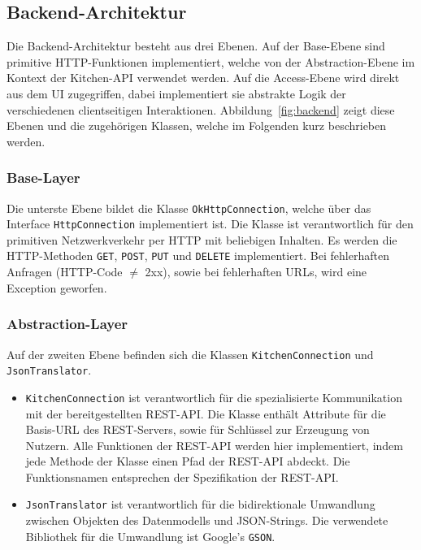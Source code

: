 \subsection{Backend-Architektur}\label{subsec:backend}

Die Backend-Architektur besteht aus drei Ebenen.
Auf der Base-Ebene sind primitive HTTP-Funktionen implementiert,
welche von der Abstraction-Ebene im Kontext der Kitchen-API verwendet werden.
Auf die Access-Ebene wird direkt aus dem UI zugegriffen, dabei implementiert sie abstrakte Logik der verschiedenen clientseitigen Interaktionen.
Abbildung~\ref{fig:backend} zeigt diese Ebenen und die zugehörigen Klassen, welche im Folgenden kurz beschrieben werden.


\subsubsection{Base-Layer}

Die unterste Ebene bildet die Klasse \texttt{OkHttpConnection}, welche über das Interface \texttt{HttpConnection} implementiert ist.
Die Klasse ist verantwortlich für den primitiven Netzwerkverkehr per HTTP mit beliebigen Inhalten.
Es werden die HTTP-Methoden \texttt{GET}, \texttt{POST}, \texttt{PUT} und \texttt{DELETE} implementiert.
Bei fehlerhaften Anfragen (HTTP-Code $\neq$ 2xx), sowie bei fehlerhaften URLs, wird eine Exception geworfen.

\subsubsection{Abstraction-Layer}

Auf der zweiten Ebene befinden sich die Klassen \texttt{KitchenConnection} und \texttt{JsonTranslator}.

\begin{itemize}
	\item  \texttt{KitchenConnection} ist verantwortlich für die spezialisierte Kommunikation mit der bereitgestellten REST-API. Die Klasse enthält Attribute für die Basis-URL des REST-Servers, sowie für Schlüssel zur Erzeugung von Nutzern.
	Alle Funktionen der REST-API werden hier implementiert, indem jede Methode der Klasse einen Pfad der REST-API abdeckt.
	Die Funktionsnamen entsprechen der Spezifikation der REST-API\@.

	\item \texttt{JsonTranslator} ist verantwortlich für die bidirektionale Umwandlung zwischen Objekten des Datenmodells und JSON-Strings.
	Die verwendete Bibliothek für die Umwandlung ist Google's \texttt{GSON}.
\end{itemize}

